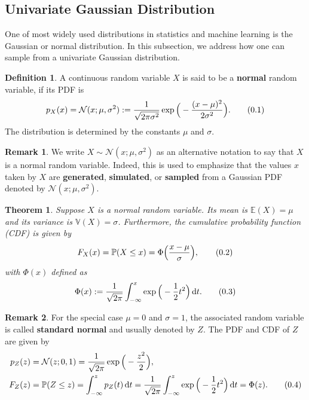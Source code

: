 \documentclass[10pt]{article}
\newtheorem{thm}{Theorem}[section]
\theoremstyle{definition}
\newtheorem{defn}{Definition}[section]
\newtheorem*{rem}{Remark}
\newcommand\eqnum{\addtocounter{equation}{1}\tag{\arabic{section}.\arabic{equation}}}
\DeclareMathOperator{\df}{d\!}
\begin{document}
\subsection{Univariate Gaussian Distribution}
One of most widely used distributions in statistics and machine learning is the Gaussian or normal distribution. In this subsection, we address how one can sample from a univariate Gaussian distribution.
\begin{defn}
A continuous random variable $X$ is said to be a \textbf{normal} random variable, if its PDF is
\begin{equation*}
p_{X}(x) = \mathcal{N}(x; \mu, \sigma^2) := \frac{1}{\sqrt{2\pi\sigma^2}}\exp\Big(-\frac{(x-\mu)^2}{2\sigma^2}\Big).
\eqnum
\end{equation*}
The distribution is determined by the constants $\mu$ and $\sigma$. 
\end{defn}
\begin{rem}
We write $X\sim \mathcal{N}(x; \mu, \sigma^2)$ as an alternative notation to say that $X$ is a normal random variable. Indeed, this is used to emphasize that the values $x$ taken by $X$ are \textbf{generated}, \textbf{simulated}, or \textbf{sampled} from a Gaussian PDF denoted by $\mathcal{N}(x; \mu, \sigma^2)$. 
\end{rem}
\begin{thm}
Suppose $X$ is a normal random variable. Its mean is $\mathbb{E}(X) = \mu$ and its variance is $\mathbb{V}(X)=\sigma$. Furthermore, the cumulative probability function (CDF) is given by
\begin{equation*}
F_{X}(x) = \mathbb{P}(X \leq x) = \Phi\Big(\frac{x-\mu}{\sigma}\Big),
\eqnum
\end{equation*}
with $\Phi(x)$ defined as
\begin{equation*}
\Phi(x) := \frac{1}{\sqrt{2\pi}}\int_{-\infty}^{x}\exp\Big(-\frac{1}{2}t^2\Big)\df t.
\eqnum
\end{equation*}
\end{thm}
\begin{rem}
For the special case $\mu = 0$ and $\sigma = 1$, the associated random variable is called \textbf{standard normal} and usually denoted by $Z$. The PDF and CDF of $Z$ are given by
\begin{align*}
p_{Z}(z) &= \mathcal{N}(z; 0, 1) = \frac{1}{\sqrt{2\pi}}\exp\Big(-\frac{z^2}{2}\Big), \\
F_Z(z) &= \mathbb{P}(Z\leq z) = \int_{-\infty}^{z}p_Z(t)\df t = 
\frac{1}{\sqrt{2\pi}}\int_{-\infty}^{z}\exp\Big(-\frac{1}{2}t^2\Big)\df t = \Phi(z).
\eqnum
\end{align*}
\end{rem}
\end{document}
